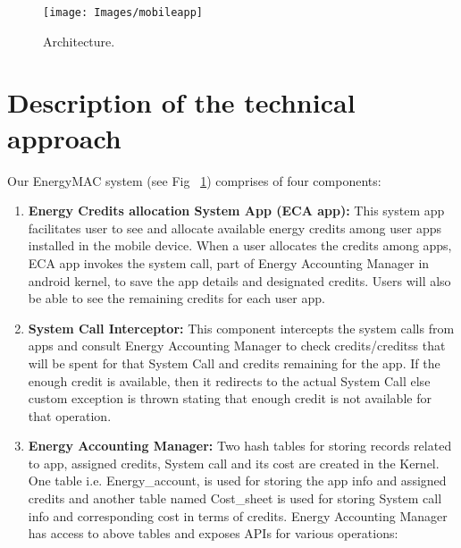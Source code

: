 \begin{figure}[t]
\centering
\texttt{[image: Images/mobileapp]}
\caption{Architecture.}
\label{fig:Architecture}
\centering
\end{figure}


\section{Description of the technical approach}

Our EnergyMAC system (see Fig ~\ref{fig:Architecture}) comprises of four components: 

\begin{enumerate}
	
	\item \textbf{Energy Credits allocation System App (ECA app):}
	This system app facilitates user to see and allocate available energy credits among user apps installed in the mobile device. When a user allocates the credits among apps, ECA app invokes the system call, part of Energy Accounting Manager in android kernel, to save the app details and designated credits. Users will also be able to see the remaining credits for each user app.
	
	\item \textbf{System Call Interceptor:}	
	This component intercepts the system calls from apps and consult Energy Accounting Manager to check credits/creditss that will be spent for that System Call and credits remaining for the app. If the enough credit is available, then it redirects to the actual System Call else custom exception is thrown stating that enough credit is not available for that operation.
	
	\item \textbf{Energy Accounting Manager:}
	Two hash tables for storing records related to app, assigned credits, System call and its cost are created in the Kernel. One table i.e. Energy\_account, is used for storing the app info and assigned credits and another table named Cost\_sheet is used for storing System call info and corresponding cost in terms of credits. 
	Energy Accounting Manager has access to above tables and exposes APIs for various operations: 
	

\end{enumerate}
